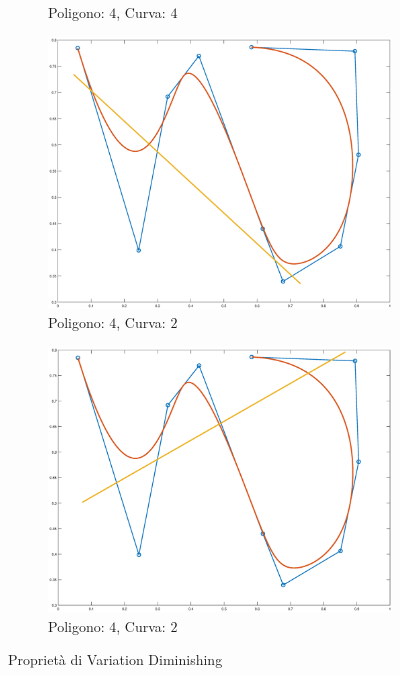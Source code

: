 \documentclass[a4paper, 12pt]{article}
\begin{document}
\begin{figure}[]
\begin{subfigure}[b]{0.3\textwidth}
      \caption{Poligono: $4$, Curva: $4$}
      \label{fig:intersection3}
  \end{subfigure}
  \begin{subfigure}[b]{0.3\textwidth}
      \includegraphics[width=\textwidth]{figure/intersection4.eps}
      \caption{Poligono: $4$, Curva: $2$}
      \label{fig:intersection4}
  \end{subfigure}
  \begin{subfigure}[b]{0.3\textwidth}
    \includegraphics[width=\textwidth]{figure/intersection5.eps}
    \caption{Poligono: $4$, Curva: $2$}
    \label{fig:intersection5}
  \end{subfigure}
  \caption{Proprietà di Variation Diminishing}\label{fig:intersection}
\end{figure}
\end{document}
